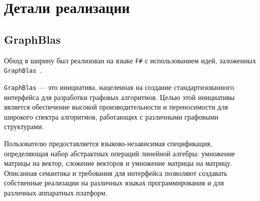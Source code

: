 
\section{Детали реализации}
\subsection{GraphBlas}
Обход в ширину был реализован на языке \texttt{F\#} с использованием идей, заложенных \texttt{GraphBlas}~\cite{graphBlas}.

\texttt{GraphBlas} --- это инициатива, нацеленная на создание стандартизованного интерфейса для разработки графовых алгоритмов. Целью этой инициативы является обеспечение высокой производительности и переносимости для широкого спектра алгоритмов, работающих с различными графовыми структурами.

Пользователю предоставляется языково-независимая спецификация, определяющая набор абстрактных операций линейной алгебры: умножение матрицы на вектор, сложение векторов и умножение матрицы на матрицу. Описанная семантика и требования для интерфейса позволяют создавать собственные реализации на различных языках программирования и для различных аппаратных платформ. 

